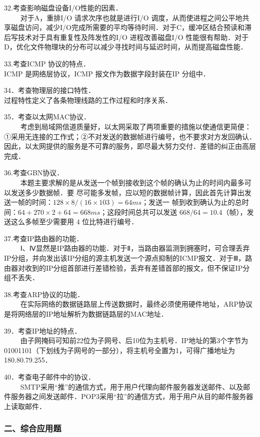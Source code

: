32.考查影响磁盘设备I/O性能的因素．\\
$\qquad$ 对于A，重排I/O 请求次序也就是进行I/O 调度，从而使进程之间公平地共享磁盘访问，减少I/O完成所需要的平均等待时间．对于C，缓冲区结合预读和滞后写技术对于具有重复性及阵发性的I/O 进程改善磁盘I/O 性能很有帮助．对于D，优化文件物理块的分布可以减少寻找时间与延迟时间，从而提高磁盘性能．

33.考查ICMP 协议的特点．\\
ICMP 是网络层协议，ICMP 报文作为数据字段封装在IP 分组中．

34．考查物理层的接口特性．\\
过程特性定义了各条物理线路的工作过程和时序关系．

35．考查以太网MAC协议．\\
$\qquad$ 考虑到局域网信道质量好，以太网采取了两项重要的措施以使通信更简便：①采用无连接的工作式；②不对发送的数据帧进行编号，也不要求对方发回确认．因此，以太网提供的服务是不可靠的服务，即尽最大努力交付．差错的纠正由高层完成．

36.考查GBN协议．\\
$\qquad$ 本题主要求解的是从发送一个帧到接收到这个帧的确认为止的时间内最多可以发送多少数据帧．要
尽可能多发帧，应以短的数据帧计算，因此首先计算出发送一帧的时间：$128 \times 8/(16\times103)=64ms$；发送一
帧到收到确认为止的总时间：$64+270\times2+64=668ms$；这段时间总共可以发送 $668/64=10.4$（帧），发送这么多帧至少需要用 $4$ 位比特进行编号．

37.考查IP路由器的功能．\\
$\qquad$ Ⅰ、Ⅳ显然是IP路由器的功能．对于Ⅱ，当路由器监测到拥塞时，可合理丢弃IP分组，并向发出该IP分组的源主机发送一个源点抑制的ICMP报文．对于Ⅲ，路由器对收到的IP分组首部进行差错检验，丢弃有差错首部的报文，但不保证IP分组不丢失．

38.考查ARP协议的功能．\\
$\qquad$ 在实际网络的数据链路层上传送数据时，最终必须使用硬件地址，ARP协议是将网络层的IP地址解析为数据链路层的MAC地址．

39．考查IP地址的特点．\\
$\qquad$ 由子网掩码可知前22位为子网号、后10位为主机号．IP地址的第3个字节为01001101（下划线为子网号的一部分），将主机号全置为1，可得广播地址为180.80.79.255．

40．考查电子邮件中的协议．\\
$\qquad$ SMTP采用“推”的通信方式，用于用户代理向邮件服务器发送邮件、以及邮件服务器之间发送邮件．POP3采用“拉”的通信方式，用于用户从目的邮件服务器上读取邮件．

\subsubsection{二、综合应用题}

